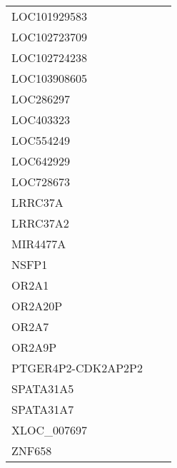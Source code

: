 \begin{tabular}{lcc}
LOC101929583       &    &         \\
LOC102723709       &    &         \\
LOC102724238       &    &         \\
LOC103908605       &    &         \\
LOC286297          &    &         \\
LOC403323          &    &         \\
LOC554249          &    &         \\
LOC642929          &    &         \\
LOC728673          &    &         \\
LRRC37A            &    &         \\
LRRC37A2           &    &         \\
MIR4477A           &    &         \\
NSFP1              &    &         \\
OR2A1              &    &         \\
OR2A20P            &    &         \\
OR2A7              &    &         \\
OR2A9P             &    &         \\
PTGER4P2-CDK2AP2P2 &    &         \\
SPATA31A5          &    &         \\
SPATA31A7          &    &         \\
XLOC\_007697        &    &         \\
ZNF658             &    &         \\
\bottomrule
\end{tabular}
